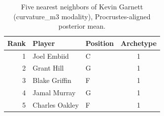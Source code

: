 \begin{table}[htbp]
  \centering\small
  \begin{tabular}{rllc}
    \toprule
    Rank & Player & Position & Archetype \\
    \midrule
    1 & Joel Embiid & C & 1 \\
    2 & Grant Hill & G & 1 \\
    3 & Blake Griffin & F & 1 \\
    4 & Jamal Murray & G & 1 \\
    5 & Charles Oakley & F & 1 \\
    \bottomrule
  \end{tabular}
  \caption{Five nearest neighbors of Kevin Garnett (curvature_m3 modality), Procrustes-aligned posterior mean.}
  \label{tab:Kevin_Garnett_neighbors_curvature_m3}
\end{table}


